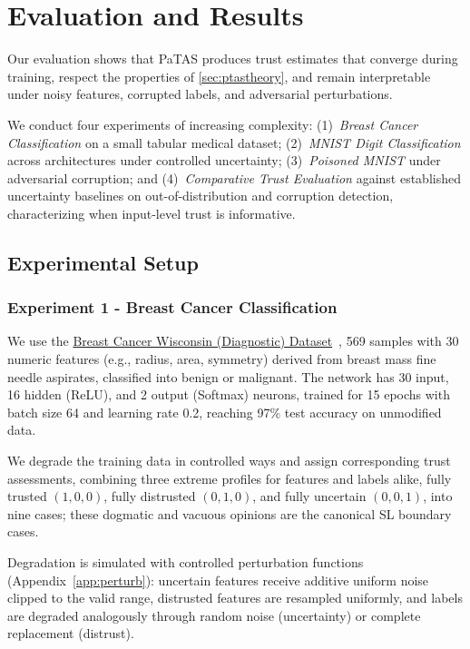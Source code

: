 \vspace{-0.5em}
\section{Evaluation and Results}\label{sec:evaluation}

Our evaluation shows that PaTAS produces trust estimates that converge during training, respect the properties of \cref{sec:ptastheory}, and remain interpretable under noisy features, corrupted labels, and adversarial perturbations.

We conduct four experiments of increasing complexity: (1)~\emph{Breast Cancer Classification} on a small tabular medical dataset; (2)~\emph{MNIST Digit Classification} across architectures under controlled uncertainty; (3)~\emph{Poisoned MNIST} under adversarial corruption; and (4)~\emph{Comparative Trust Evaluation} against established uncertainty baselines on out-of-distribution and corruption detection, characterizing when input-level trust is informative.

\vspace{-0.5em}
\subsection{Experimental Setup }
\subsubsection{Experiment 1 - Breast Cancer Classification}\label{exp:1}
We use the \href{https://archive.ics.uci.edu/dataset/17/breast+cancer+wisconsin+diagnostic}{Breast Cancer Wisconsin (Diagnostic) Dataset}~\cite{breastcancer-wisconsin}, 569 samples with 30 numeric features (e.g., radius, area, symmetry) derived from breast mass fine needle aspirates, classified into benign or malignant. The network has 30 input, 16 hidden (ReLU), and 2 output (Softmax) neurons, trained for 15 epochs with batch size 64 and learning rate 0.2, reaching 97\% test accuracy on unmodified data.

We degrade the training data in controlled ways and assign corresponding trust assessments, combining three extreme profiles for features and labels alike, fully trusted \((1,0,0)\), fully distrusted \((0,1,0)\), and fully uncertain \((0,0,1)\), into nine cases; these dogmatic and vacuous opinions are the canonical SL boundary cases.

Degradation is simulated with controlled perturbation functions (Appendix~\ref{app:perturb}): uncertain features receive additive uniform noise clipped to the valid range, distrusted features are resampled uniformly, and labels are degraded analogously through random noise (uncertainty) or complete replacement (distrust).

